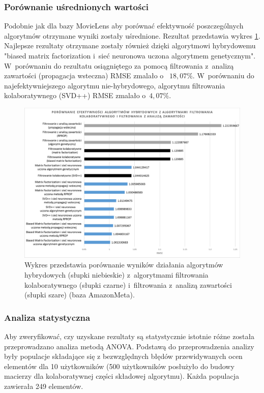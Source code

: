 \documentclass[twoside]{iisthesis}
\begin{document}
		\subsubsection{Porównanie uśrednionych wartości}
		
		Podobnie jak dla bazy MovieLens aby porównać efektywność poszczególnych algorytmów otrzymane wyniki zostały uśrednione. Rezultat przedstawia wykres \ref{fig:am_exphybrid}. Najlepsze rezultaty otrzymane zostały również dzięki algorytmowi hybrydowemu "biased matrix factorization i~sieć neuronowa uczona algorytmem genetycznym". W~porównaniu do rezultatu osiągniętego za pomocą filtrowania z~analizą zawartości (propagacja wsteczna) RMSE zmalało o~ $18,07\%$. W~porównaniu do najefektywniejszego algorytmu nie-hybrydowego, algorytmu filtrowania kolaboratywnego (SVD++) RMSE zmalało o~$4,07\%$.
		
		\begin{figure}
			\centering
			\includegraphics[width=1\textwidth]{am_exphybrid}	
			\caption{Wykres przedstawia porównanie wyników działania algorytmów hybrydowych (słupki niebieskie) z~algorytmami filtrowania kolaboratywnego (słupki czarne) i~filtrowania z~analizą zawartości (słupki szare) (baza AmazonMeta).}
			\label{fig:am_exphybrid}
		\end{figure}
		
		\subsubsection{Analiza statystyczna}
		
		Aby zweryfikować, czy uzyskane rezultaty są statystycznie istotnie różne została przeprowadzano analiza metodą ANOVA. Podstawą do przeprowadzenia analizy były populacje składające się z bezwzględnych błędów przewidywanych ocen elementów dla 10 użytkowników (500 użytkowników posłużyło do budowy macierzy dla kolaboratywnej części składowej algorytmu). Każda populacja zawierała 249 elementów. 
		
\end{document}
